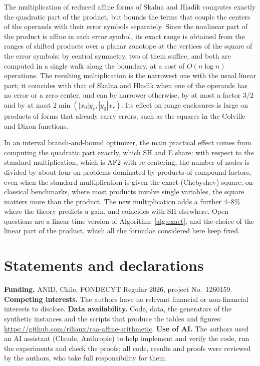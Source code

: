 \documentclass[10pt]{article}
\theoremstyle{definition}
\begin{document}
The multiplication of reduced affine forms of Skalna and Hlad\'{\i}k computes exactly the quadratic part of the product, but bounds the terms that couple the centers of the operands with their error symbols separately. Since the nonlinear part of the product is affine in each error symbol, its exact range is obtained from the ranges of shifted products over a planar zonotope at the vertices of the square of the error symbols; by central symmetry, two of them suffice, and both are computed in a single walk along the boundary, at a cost of $O(n\log n)$ operations. The resulting multiplication is the narrowest one with the usual linear part; it coincides with that of Skalna and Hlad\'{\i}k when one of the operands has no error or a zero center, and can be narrower otherwise, by at most a factor $3/2$ and by at most $2\min(|x_0|y_r,|y_0|x_r)$. Its effect on range enclosures is large on products of forms that already carry errors, such as the squares in the Colville and Dixon functions.

In an interval branch-and-bound optimizer, the main practical effect comes from computing the quadratic part exactly, which SH and E share: with respect to the standard multiplication, which is AF2 with re-centering, the number of nodes is divided by about four on problems dominated by products of compound factors, even when the standard multiplication is given the exact (Chebyshev) square; on classical benchmarks, where most products involve single variables, the square matters more than the product. The new multiplication adds a further 4--8\% where the theory predicts a gain, and coincides with SH elsewhere. Open questions are a linear-time version of Algorithm~\ref{alg:exact}, and the choice of the linear part of the product, which all the formulae considered here keep fixed.

\section*{Statements and declarations}
\textbf{Funding.} ANID, Chile, FONDECYT Regular 2026, project No.~1260159.
\textbf{Competing interests.} The authors have no relevant financial or non-financial interests to disclose.
\textbf{Data availability.} Code, data, the generators of the synthetic instances and the scripts that produce the tables and figures: \url{https://github.com/rilianx/raa-affine-arithmetic}.
\textbf{Use of AI.} The authors used an AI assistant (Claude, Anthropic) to help implement and verify the code, run the experiments and check the proofs; all code, results and proofs were reviewed by the authors, who take full responsibility for them.



\end{document}
